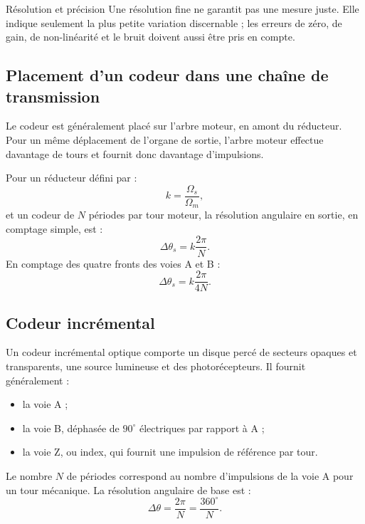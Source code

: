 
\begin{TLLogicWarning}{Résolution et précision}
Une résolution fine ne garantit pas une mesure juste. Elle indique seulement la plus petite variation discernable ; les erreurs de zéro, de gain, de non-linéarité et le bruit doivent aussi être pris en compte.
\end{TLLogicWarning}

\subsection{Placement d'un codeur dans une chaîne de transmission}

Le codeur est généralement placé sur l'arbre moteur, en amont du réducteur. Pour un même déplacement de l'organe de sortie, l'arbre moteur effectue davantage de tours et fournit donc davantage d'impulsions.

Pour un réducteur défini par :
\[
k=\frac{\Omega_s}{\Omega_m},
\]
et un codeur de $N$ périodes par tour moteur, la résolution angulaire en sortie, en comptage simple, est :
\[
\boxed{\Delta\theta_s=k\frac{2\pi}{N}.}
\]
En comptage des quatre fronts des voies A et B :
\[
\boxed{\Delta\theta_s=k\frac{2\pi}{4N}.}
\]

\subsection{Codeur incrémental}

Un codeur incrémental optique comporte un disque percé de secteurs opaques et transparents, une source lumineuse et des photorécepteurs. Il fournit généralement :
\begin{itemize}
  \item la voie A ;
  \item la voie B, déphasée de $90^\circ$ électriques par rapport à A ;
  \item la voie Z, ou index, qui fournit une impulsion de référence par tour.
\end{itemize}

\begin{center}\TLCodeurIncremental\end{center}

Le nombre $N$ de périodes correspond au nombre d'impulsions de la voie A pour un tour mécanique. La résolution angulaire de base est :
\[
\boxed{\Delta\theta=\frac{2\pi}{N}=\frac{360^\circ}{N}.}
\]

